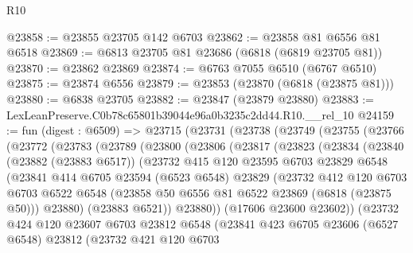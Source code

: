 \begin{lexlean}{R10}
\begin{coremodule}
@23858 := @23855 @23705 @142 @6703
@23862 := @23858 @81 @6556 @81 @6518
@23869 := @6813 @23705 @81 @23686 (@6818 (@6819 @23705 @81))
@23870 := @23862 @23869
@23874 := @6763 @7055 @6510 (@6767 @6510)
@23875 := @23874 @6556
@23879 := @23853 (@23870 (@6818 (@23875 @81)))
@23880 := @6838 @23705
@23882 := @23847 (@23879 @23880)
@23883 := LexLeanPreserve.C0b78c65801b39044e96a0b3235c2dd44.R10.__rel_10
@24159 := fun (digest : @6509) =>
  @23715
    (@23731
      (@23738
        (@23749
          (@23755
            (@23766
              (@23772
                (@23783
                  (@23789
                    (@23800
                      (@23806
                        (@23817
                          (@23823
                            (@23834
                              (@23840
                                (@23882 (@23883 @6517))
                                (@23732
                                  @415
                                  @120
                                  @23595
                                  @6703
                                  @23829
                                  @6548
                                  (@23841
                                    @414
                                    @6705
                                    @23594
                                    (@6523 @6548)
                                    @23829
                                    (@23732
                                      @412
                                      @120
                                      @6703
                                      @6703
                                      @6522
                                      @6548
                                      (@23858 @50 @6556 @81 @6522 @23869 (@6818 (@23875 @50)))
                                      @23880)
                                    (@23883 @6521))
                                  @23880))
                              (@17606 @23600 @23602))
                            (@23732
                              @424
                              @120
                              @23607
                              @6703
                              @23812
                              @6548
                              (@23841
                                @423
                                @6705
                                @23606
                                (@6527 @6548)
                                @23812
                                (@23732
                                  @421
                                  @120
                                  @6703

\end{coremodule}
\end{lexlean}

